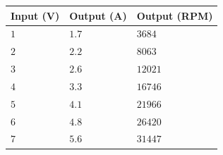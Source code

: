 \begin{table}[H]
\begin{tabular}{|l|l|l|}
\hline%
  \textbf{Input (V)}  & \textbf{Output (A)} & \textbf{Output (RPM)} \\
\hline%
  $1$                 &            $1.7$  &  $3684$                 \\
\hline%
  $2$                 &            $2.2$  &  $8063$                 \\
\hline%
  $3$                 &            $2.6$  &  $12021$                \\
\hline%
  $4$                 &            $3.3$  &  $16746$                \\
\hline%
  $5$                 &            $4.1$  &  $21966$                \\
\hline%
  $6$                 &            $4.8$  &  $26420$                \\
\hline%
  $7$                 &            $5.6$  &  $31447$                \\
\hline%
\end{tabular}
\end{table}
